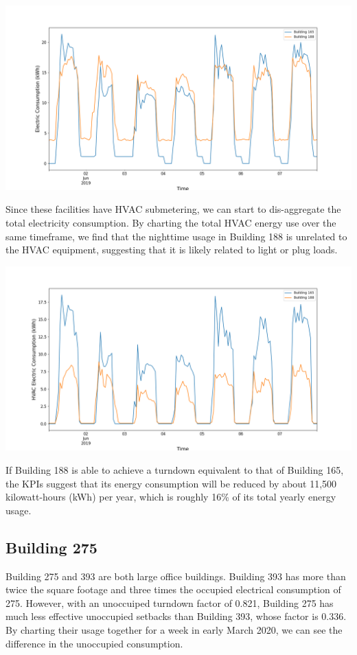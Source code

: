 \documentclass[a4paper]{article}
\begin{document}
\includegraphics[width=.9\columnwidth]{./images/188v165_Turndown.png}

Since these facilities have HVAC submetering, we can start to dis-aggregate the total electricity consumption. By charting the total HVAC energy use over the same timeframe, we find that the nighttime usage in Building 188 is unrelated to the HVAC equipment, suggesting that it is likely related to light or plug loads.

\includegraphics[width=.9\columnwidth]{./images/188v165_Turndown_HVAC.png}

If Building 188 is able to achieve a turndown equivalent to that of Building 165, the KPIs suggest that its energy consumption will be reduced by about 11,500 kilowatt-hours (kWh) per year, which is roughly 16\% of its total yearly energy usage.

\subsection{Building 275}

Building 275 and 393 are both large office buildings. Building 393 has more than twice the square footage and three times the occupied electrical consumption of 275. However, with an unoccuiped turndown factor of 0.821, Building 275 has much less effective unoccupied setbacks than Building 393, whose factor is 0.336. By charting their usage together for a week in early March 2020, we can see the difference in the unoccupied consumption.
\end{document}
